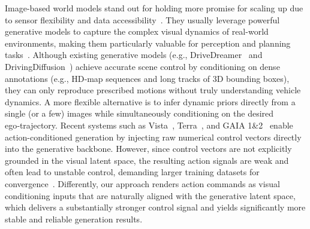 \documentclass{article}
\begin{document}
Image-based world models stand out for holding more promise for scaling up due to sensor flexibility and data accessibility~\cite{wang2023drivedreamer, zhao2024drivedreamer, zhao2024drivedreamer4d, ni2024recondreamer, wang2024worlddreamer, gao2024cardreamer, li2023drivingdiffusion, ma2024unleashing}.
They usually leverage powerful generative models to capture the complex visual dynamics of real-world environments, making them particularly valuable for perception and planning tasks~\cite{hu2024drivingworld, hu2023gaia, sreeram2024probing, wu2024holodrive, zhang2024bevworld, swerdlow2024street, wang2024drivingdojo, yang2024drivearena, yan2024drivingsphere, garg2024imagine, gao2024vista, zhou2024simgen, li2024enhancing, popov2024mitigating}. Although existing generative models (e.g., DriveDreamer~\cite{wang2023drivedreamer} and DrivingDiffusion~\cite{li2023drivingdiffusion}) achieve accurate scene control by conditioning on dense annotations (e.g., HD‑map sequences and long tracks of 3D bounding boxes), they can only reproduce prescribed motions without truly understanding vehicle dynamics. 
A more flexible alternative is to infer dynamic priors directly from a single (or a few) images while simultaneously conditioning on the desired ego‑trajectory.
Recent systems such as Vista~\cite{gao2024vista}, Terra~\cite{arai2024actbench}, and GAIA 1\&2~\cite{gaia1-2023,russell2025gaia2controllablemultiviewgenerative} enable action-conditioned generation by injecting raw numerical control vectors directly into the generative backbone. 
However, since control vectors are not explicitly grounded in the visual latent space, the resulting action signals are weak and often lead to unstable control, demanding larger training datasets for convergence~\cite{gao2024vista, gaia1-2023}. 
Differently, our approach renders action commands as visual conditioning inputs that are naturally aligned with the generative latent space, which delivers a substantially stronger control signal and yields significantly more stable and reliable generation results.
\end{document}

